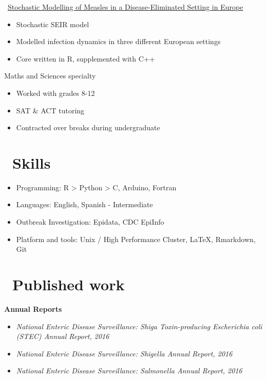 \documentclass{resume}
\begin{document}
\faGithubSquare\ \href{https://github.com/beansrowning/modelling}{Stochastic Modelling of Measles in a Disease-Eliminated Setting in Europe}
\begin{itemize}
  \item Stochastic SEIR model
  \item Modelled infection dynamics in three different European settings
  \item Core written in R, supplemented with C++
\end{itemize}

Maths and Sciences specialty
\begin{itemize}
  \item Worked with grades 8-12
  \item SAT \& ACT tutoring
  \item Contracted over breaks during undergraduate
\end{itemize}

\section{\faCogs\ Skills}
\begin{itemize}[parsep=0.5ex]
  \item Programming: R > Python > C, Arduino, Fortran
  \item Languages: English, Spanish - Intermediate
  \item Outbreak Investigation: Epidata, CDC EpiInfo
  \item Platform and tools: Unix / High Performance Cluster, \LaTeX, Rmarkdown, Git
\end{itemize}

\section{\faFileTextO\ Published work}

\textbf{Annual Reports}

\begin{itemize}
  \item \textit{National Enteric Disease Surveillance: Shiga Toxin-producing Escherichia coli (STEC) Annual Report, 2016}
  \item \textit{National Enteric Disease Surveillance: Shigella Annual Report, 2016}
  \item \textit{National Enteric Disease Surveillance: Salmonella Annual Report, 2016} \\
\end{itemize}
\end{document}
